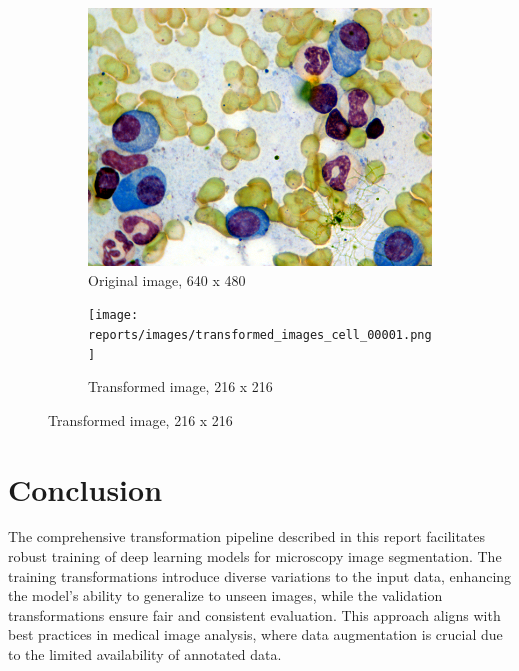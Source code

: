 \documentclass[]{article}
\begin{document}
\begin{figure}[!h]
    \begin{subfigure}[b]{0.45\textwidth}
        \centering
        \includegraphics[scale=0.5]{reports/images/cell_00001.png}
        \caption{Original image, 640 x 480}
    \end{subfigure}
    \hfill
    \begin{subfigure}[b]{0.45\textwidth}
        \centering
        \texttt{[image: reports/images/transformed\_images\_cell\_00001.png]}
        \caption{Transformed image, 216 x 216}
    \end{subfigure}
    \label{fig:transformed_images}
\end{figure}

\section{Conclusion}
The comprehensive transformation pipeline described in this report facilitates robust training of deep learning models for microscopy image segmentation. The training transformations introduce diverse variations to the input data, enhancing the model's ability to generalize to unseen images, while the validation transformations ensure fair and consistent evaluation. This approach aligns with best practices in medical image analysis, where data augmentation is crucial due to the limited availability of annotated data.
\end{document}
